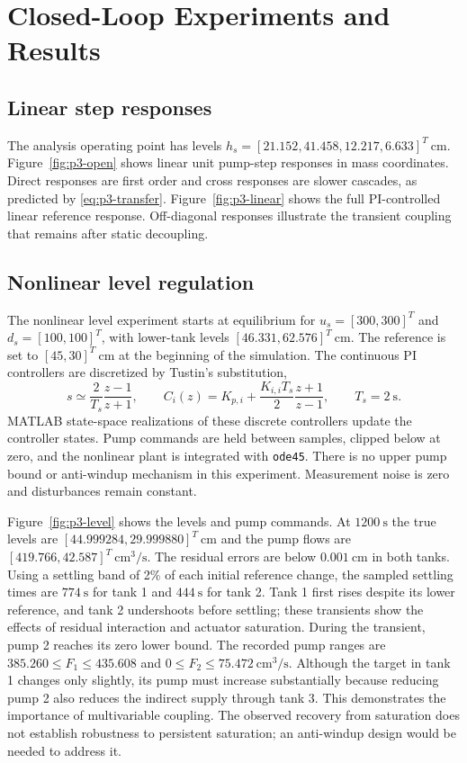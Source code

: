 \section{Closed-Loop Experiments and Results}

\subsection{Linear step responses}

The analysis operating point has levels
$h_s=[21.152,41.458,12.217,6.633]^T\ \mathrm{cm}$.
Figure~\ref{fig:p3-open} shows linear unit pump-step responses in mass
coordinates. Direct responses are first order and cross responses are
slower cascades, as predicted by \eqref{eq:p3-transfer}.
Figure~\ref{fig:p3-linear} shows the full PI-controlled linear reference
response. Off-diagonal responses illustrate the transient coupling that
remains after static decoupling.

\subsection{Nonlinear level regulation}

The nonlinear level experiment starts at equilibrium for
$u_s=[300,300]^T$ and $d_s=[100,100]^T$, with lower-tank levels
$[46.331,62.576]^T\ \mathrm{cm}$. The reference is set to
$[45,30]^T\ \mathrm{cm}$ at the beginning of the simulation. The continuous
PI controllers are discretized by Tustin's substitution,
\begin{equation}
 s\simeq\frac{2}{T_s}\frac{z-1}{z+1},\qquad
 C_i(z)=K_{p,i}+\frac{K_{i,i}T_s}{2}\frac{z+1}{z-1},\qquad T_s=2\ \mathrm{s}.
\end{equation}
MATLAB state-space realizations of these discrete controllers update the
controller states. Pump commands are held between samples, clipped below
at zero, and the nonlinear plant is integrated with \texttt{ode45}.
There is no upper pump bound or anti-windup mechanism in this experiment.
Measurement noise is zero and disturbances remain constant.

Figure~\ref{fig:p3-level} shows the levels and pump commands. At
$1200\ \mathrm{s}$ the true levels are
$[44.999284,29.999880]^T\ \mathrm{cm}$ and the pump flows are
$[419.766,42.587]^T\ \mathrm{cm^3/s}$.
The residual errors are below $0.001\ \mathrm{cm}$ in both tanks.
Using a settling band of 2\% of each initial reference change, the
sampled settling times are $774\ \mathrm{s}$ for tank 1 and
$444\ \mathrm{s}$ for tank 2. Tank 1 first rises despite its lower
reference, and tank 2 undershoots before settling; these transients show
the effects of residual interaction and actuator saturation.
During the transient, pump 2 reaches its zero lower bound. The recorded
pump ranges are $385.260\leq F_1\leq435.608$ and
$0\leq F_2\leq75.472\ \mathrm{cm^3/s}$.
Although the target in tank 1 changes only slightly, its pump must increase
substantially because reducing pump 2 also reduces the indirect supply
through tank 3. This demonstrates the importance of multivariable coupling.
The observed recovery from saturation does not establish robustness to
persistent saturation; an anti-windup design would be needed to address it.

